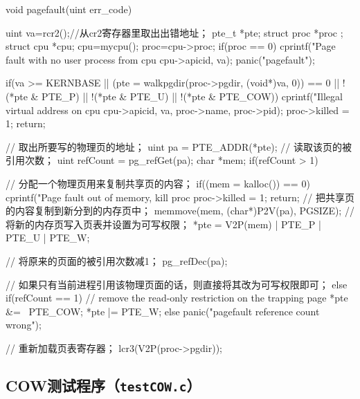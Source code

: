 \documentclass{swfuthesism}
\begin{document}
\begin{ccode}
void pagefault(uint err_code)
{
  uint va=rcr2();//从cr2寄存器里取出出错地址；
  pte_t *pte;
  struct proc *proc ;
  struct cpu *cpu;
  cpu=mycpu();
  proc=cpu->proc;
  if(proc == 0){
    cprintf("Page fault with no user process from cpu %
            cpu->apicid, va);
    panic("pagefault");
  }

  if(va >= KERNBASE || (pte = walkpgdir(proc->pgdir, (void*)va, 0)) == 0  ||
     !(*pte & PTE_P) || !(*pte & PTE_U) || !(*pte & PTE_COW)){
    cprintf("Illegal virtual address on cpu %
            cpu->apicid, va, proc->name, proc->pid);
    proc->killed = 1;
    return;
  }
 
    // 取出所要写的物理页的地址；
    uint pa = PTE_ADDR(*pte);
    // 读取该页的被引用次数；
    uint refCount = pg_refGet(pa);
    char *mem;
    if(refCount > 1) {

        // 分配一个物理页用来复制共享页的内容；
        if((mem = kalloc()) == 0) {
          cprintf("Page fault out of memory, kill proc %
          proc->killed = 1;
         return;
        }
        // 把共享页的内容复制到新分到的内存页中；
        memmove(mem, (char*)P2V(pa), PGSIZE);
        // 将新的内存页写入页表并设置为可写权限；
        *pte = V2P(mem) | PTE_P | PTE_U | PTE_W;
        
        // 将原来的页面的被引用次数减1；
        pg_refDec(pa);
    }
    // 如果只有当前进程引用该物理页面的话，则直接将其改为可写权限即可；
    else if(refCount == 1){
      // remove the read-only restriction on the trapping page
      *pte &= ~PTE_COW;
      *pte |= PTE_W;
    }
    else{
      panic("pagefault reference count wrong\n");
    }

    // 重新加载页表寄存器；
    lcr3(V2P(proc->pgdir));
}
\end{ccode}

\subsection{COW测试程序（\texttt{testCOW.c}）}
\label{src:testCOW.c}
\end{document}
